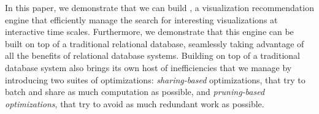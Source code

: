 


In this paper, we demonstrate that we can build \SeeDB,
a visualization recommendation engine that efficiently manage the search
for interesting visualizations at interactive time scales.
Furthermore, we demonstrate that this engine
can be built on top of a traditional relational database,
seamlessly taking advantage of all the benefits of relational database systems.
Building \SeeDB on top of a traditional database system
also brings its own host of inefficiencies that 
we manage by introducing two suites of optimizations:
{\em sharing-based} optimizations, that try to batch
and share as much computation as possible,
and {\em pruning-based optimizations}, that try to avoid
as much redundant work as possible.



